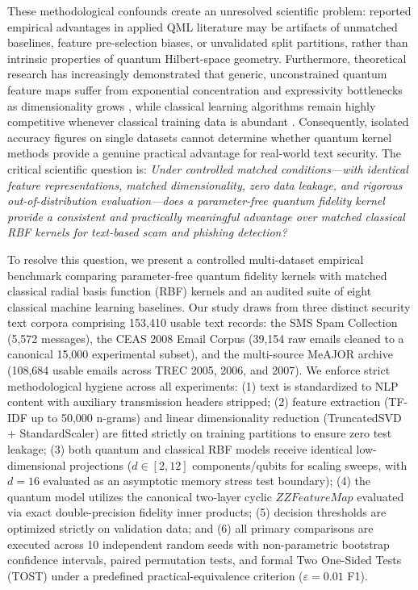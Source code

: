 \documentclass[10pt,twocolumn,letterpaper]{article}
\begin{document}
These methodological confounds create an unresolved scientific problem: reported empirical advantages in applied QML literature may be artifacts of unmatched baselines, feature pre-selection biases, or unvalidated split partitions, rather than intrinsic properties of quantum Hilbert-space geometry. Furthermore, theoretical research has increasingly demonstrated that generic, unconstrained quantum feature maps suffer from exponential concentration and expressivity bottlenecks as dimensionality grows \cite{thanasilp2024exponential,kubler2021inductive}, while classical learning algorithms remain highly competitive whenever classical training data is abundant \cite{huang2021power}. Consequently, isolated accuracy figures on single datasets cannot determine whether quantum kernel methods provide a genuine practical advantage for real-world text security. The critical scientific question is: \textit{Under controlled matched conditions---with identical feature representations, matched dimensionality, zero data leakage, and rigorous out-of-distribution evaluation---does a parameter-free quantum fidelity kernel provide a consistent and practically meaningful advantage over matched classical RBF kernels for text-based scam and phishing detection?}

To resolve this question, we present a controlled multi-dataset empirical benchmark comparing parameter-free quantum fidelity kernels with matched classical radial basis function (RBF) kernels and an audited suite of eight classical machine learning baselines. Our study draws from three distinct security text corpora comprising 153,410 usable text records: the SMS Spam Collection (5,572 messages), the CEAS 2008 Email Corpus (39,154 raw emails cleaned to a canonical 15,000 experimental subset), and the multi-source MeAJOR archive (108,684 usable emails across TREC 2005, 2006, and 2007). We enforce strict methodological hygiene across all experiments: (1) text is standardized to NLP content with auxiliary transmission headers stripped; (2) feature extraction (TF-IDF up to 50,000 n-grams) and linear dimensionality reduction (TruncatedSVD + StandardScaler) are fitted strictly on training partitions to ensure zero test leakage; (3) both quantum and classical RBF models receive identical low-dimensional projections ($d \in [2, 12]$ components/qubits for scaling sweeps, with $d=16$ evaluated as an asymptotic memory stress test boundary); (4) the quantum model utilizes the canonical two-layer cyclic $ZZFeatureMap$ evaluated via exact double-precision fidelity inner products; (5) decision thresholds are optimized strictly on validation data; and (6) all primary comparisons are executed across 10 independent random seeds with non-parametric bootstrap confidence intervals, paired permutation tests, and formal Two One-Sided Tests (TOST) under a predefined practical-equivalence criterion ($\varepsilon = 0.01$ F1).
\end{document}
